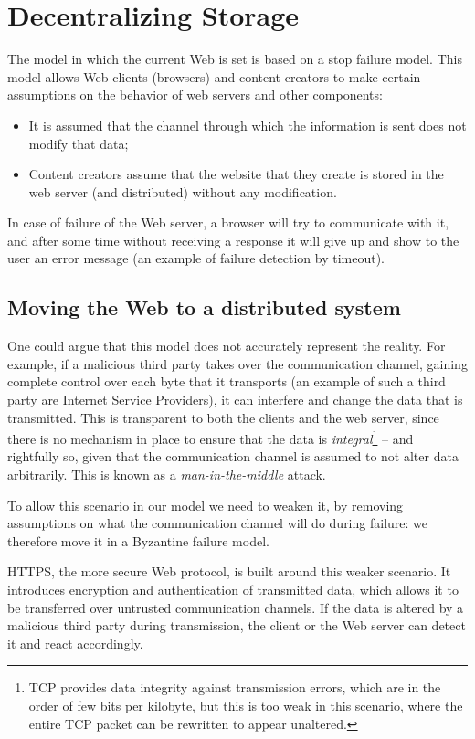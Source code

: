 \documentclass[mscthesis]{usiinfthesis}
\begin{document}
\chapter{Decentralizing Storage}\label{ch:storage}

The model in which the current Web is set is based on a stop failure model. This model allows Web clients (browsers) and content creators to make certain assumptions on the behavior of web servers and other components:
\begin{itemize}
	\item It is assumed that the channel through which the information is sent does not modify that data;
	\item Content creators assume that the website that they create is stored in the web server (and distributed) without any modification.
\end{itemize}
In case of failure of the Web server, a browser will try to communicate with it, and after some time without receiving a response it will give up and show to the user an error message (an example of failure detection by timeout).

\section{Moving the Web to a distributed system}\label{sec:movingstorage}

One could argue that this model does not accurately represent the reality. For example, if a malicious third party takes over the communication channel, gaining complete control over each byte that it transports (an example of such a third party are Internet Service Providers), it can interfere and change the data that is transmitted. This is transparent to both the clients and the web server, since there is no mechanism in place to ensure that the data is \textit{integral}\footnote{TCP provides data integrity against transmission errors, which are in the order of few bits per kilobyte, but this is too weak in this scenario, where the entire TCP packet can be rewritten to appear unaltered.} -- and rightfully so, given that the communication channel is assumed to not alter data arbitrarily. This is known as a \textit{man-in-the-middle} attack.

To allow this scenario in our model we need to weaken it, by removing assumptions on what the communication channel will do during failure: we therefore move it in a Byzantine failure model.

HTTPS, the more secure Web protocol, is built around this weaker scenario. It introduces encryption and authentication of transmitted data, which allows it to be transferred over untrusted communication channels. If the data is altered by a malicious third party during transmission, the client or the Web server can detect it and react accordingly.
\end{document}
